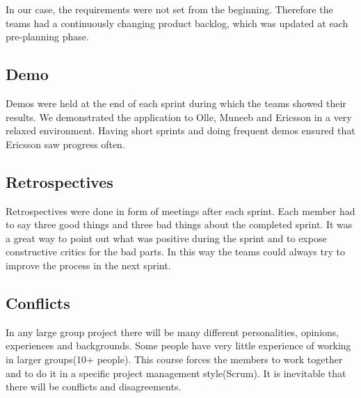 In our case, the requirements were not set from the beginning. Therefore the teams had a continuously
changing product backlog, which was updated at each pre-planning phase.

\subsection{Demo}
Demos were held at the end of each sprint during which the teams showed their results.
We demonstrated the application to Olle, Muneeb and Ericsson in a very relaxed environment. Having short sprints and doing frequent
demos ensured that Ericsson saw progress often.

\subsection{Retrospectives}
Retrospectives were done in form of meetings after each sprint. Each member had to say three good things and three bad things about
the completed sprint. It was a great way to point out what was positive during the sprint
and to expose constructive critics for the bad parts. In this way the teams could always try to improve the process in the next sprint.

\subsection{Conflicts}
In any large group project there will be many different personalities, opinions, experiences and backgrounds. Some people have very little experience of working in larger groups(10+ people). This course forces the members to work together and to do it in a specific project management style(Scrum). It is inevitable that there will be conflicts and disagreements. 

